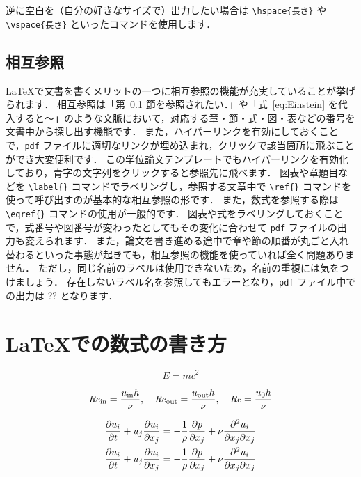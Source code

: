 逆に空白を（自分の好きなサイズで）出力したい場合は \verb|\hspace{長さ}| や \verb|\vspace{長さ}| といったコマンドを使用します．

\subsection{相互参照}
\label{ssec:ref}

\LaTeX で文書を書くメリットの一つに相互参照の機能が充実していることが挙げられます．
相互参照は「第~\ref{ssec:ref} 節を参照されたい．」や「式~\eqref{eq:Einstein} を代入すると～」のような文脈において，対応する章・節・式・図・表などの番号を文書中から探し出す機能です．
また，ハイパーリンクを有効にしておくことで，\verb|pdf| ファイルに適切なリンクが埋め込まれ，クリックで該当箇所に飛ぶことができ大変便利です．
この学位論文テンプレートでもハイパーリンクを有効化しており，青字の文字列をクリックすると参照先に飛べます．
図表や章題目などを \verb|\label{}| コマンドでラベリングし，参照する文章中で \verb|\ref{}| コマンドを使って呼び出すのが基本的な相互参照の形です．
また，数式を参照する際は \verb|\eqref{}| コマンドの使用が一般的です．
図表や式をラベリングしておくことで，式番号や図番号が変わったとしてもその変化に合わせて \verb|pdf| ファイルの出力も変えられます．
また，論文を書き進める途中で章や節の順番が丸ごと入れ替わるといった事態が起きても，相互参照の機能を使っていれば全く問題ありません．
ただし，同じ名前のラベルは使用できないため，名前の重複には気をつけましょう．
存在しないラベル名を参照してもエラーとなり，\verb|pdf| ファイル中での出力は ?? となります．


\section{\LaTeX での数式の書き方}
\label{sec:formula_in_LaTeX}


\begin{equation}
    E = mc^2
    \label{eq:Einstein}
\end{equation}

\begin{equation}
    \mathit{Re}_{\mathrm{in}} = \frac{u_{\mathrm{in}} h}{\nu}, \quad \mathit{Re}_{\mathrm{out}} = \frac{u_{\mathrm{out}} h}{\nu}, \quad \mathit{Re} = \frac{u_0 h}{\nu}
\end{equation}

\begin{align}
    \frac{\partial u_i}{\partial t} + u_j\frac{\partial u_i}{\partial x_j} &= - \frac{1}{\rho}\frac{\partial p}{\partial x_j} + \nu\frac{\partial^2 u_i}{\partial x_j \partial x_j} \\
    \pdv{u_i}{t} + u_j\pdv{u_i}{x_j} &= - \frac{1}{\rho}\pdv{p}{x_j} + \nu\pdv{u_i}{x_j}{x_j}
\end{align}


